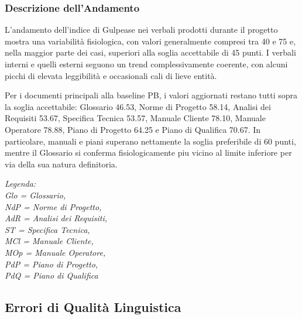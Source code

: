 \documentclass[a4paper,11pt,oneside]{scrartcl}
\begin{document}
\subsubsection*{Descrizione dell'Andamento}

L'andamento dell'indice di Gulpease nei verbali prodotti durante il progetto mostra una variabilità fisiologica, con valori generalmente compresi tra 40 e 75 e, nella maggior parte dei casi, superiori alla soglia accettabile di 45 punti. I verbali interni e quelli esterni seguono un trend complessivamente coerente, con alcuni picchi di elevata leggibilità e occasionali cali di lieve entità.

Per i documenti principali alla baseline PB, i valori aggiornati restano tutti sopra la soglia accettabile: Glossario 46.53, Norme di Progetto 58.14, Analisi dei Requisiti 53.67, Specifica Tecnica 53.57, Manuale Cliente 78.10, Manuale Operatore 78.88, Piano di Progetto 64.25 e Piano di Qualifica 70.67. In particolare, manuali e piani superano nettamente la soglia preferibile di 60 punti, mentre il Glossario si conferma fisiologicamente piu vicino al limite inferiore per via della sua natura definitoria.

\noindent\textit{\small Legenda: \\Glo = Glossario, \\NdP = Norme di Progetto, \\AdR = Analisi dei Requisiti, \\ST = Specifica Tecnica, \\MCl = Manuale Cliente, \\MOp = Manuale Operatore, \\PdP = Piano di Progetto, \\PdQ = Piano di Qualifica}

\subsection{Errori di Qualità Linguistica}
\end{document}
